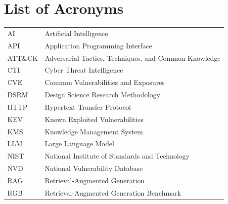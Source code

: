 \chapter*{List of Acronyms}
\begin{longtable}{@{}p{}p{}@{}}
AI & Artificial Intelligence \\
API & Application Programming Interface \\
ATT\&CK & Adversarial Tactics, Techniques, and Common Knowledge \\
CTI & Cyber Threat Intelligence \\
CVE & Common Vulnerabilities and Exposures \\
DSRM & Design Science Research Methodology \\
HTTP & Hypertext Transfer Protocol \\
KEV & Known Exploited Vulnerabilities \\
KMS & Knowledge Management System \\
LLM & Large Language Model \\
NIST & National Institute of Standards and Technology \\
NVD & National Vulnerability Database \\
RAG & Retrieval-Augmented Generation \\
RGB & Retrieval-Augmented Generation Benchmark \\
\end{longtable}
